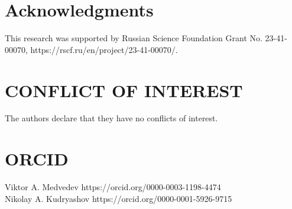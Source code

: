 \documentclass[preprint,12pt]{elsarticle}
\begin{document}
\section*{Acknowledgments}
This research was supported by Russian Science Foundation Grant No. 23-41-00070, https://rscf.ru/en/project/23-41-00070/.
\section*{CONFLICT OF INTEREST}
The authors declare that they have no conflicts of interest.
\section*{ORCID}
Viktor A. Medvedev https://orcid.org/0000-0003-1198-4474\\
Nikolay A. Kudryashov https://orcid.org/0000-0001-5926-9715



\end{document}
